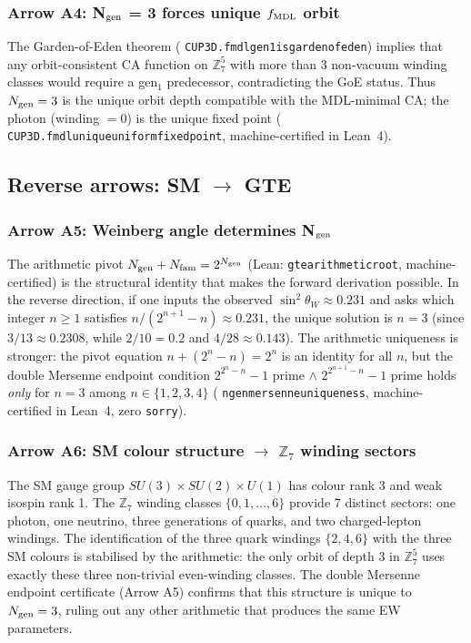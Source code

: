 \documentclass[11pt]{article}
\theoremstyle{remark}
\newcommand{\ZS}{\mathbb{Z}_7}
\newcommand{\Ngen}{N_{\rm gen}}
\newcommand{\Nfam}{N_{\rm fam}}
\newcommand{\lean}[1]{%
  \penalty-100
  \begingroup\def\_{\textunderscore\allowbreak}\texttt{#1}\endgroup}
\newcommand{\sinwsq}{\sin^2\!\theta_W}
\begin{document}
\subsubsection*{Arrow A4: N$_{\rm gen}$ = 3 forces unique \texorpdfstring{$f_{\rm MDL}$}{fMDL} orbit}

The Garden-of-Eden theorem (\lean{CUP3D.fmdl\_gen1\_is\_garden\_of\_eden}) implies that any
orbit-consistent CA function on $\ZS^5$ with more than 3 non-vacuum winding classes would
require a gen$_1$ predecessor, contradicting the GoE status.
Thus $\Ngen = 3$ is the unique orbit depth compatible with the MDL-minimal CA;
the photon (winding $= 0$) is the unique fixed point (\lean{CUP3D.fmdl\_unique\_uniform\_fixed\_point}, machine-certified in Lean~4).

\subsection{Reverse arrows: SM $\to$ GTE}
\label{sec:arrows_reverse}

\subsubsection*{Arrow A5: Weinberg angle determines N$_{\rm gen}$}

The arithmetic pivot $\Ngen + \Nfam = 2^{\Ngen}$ (Lean: \lean{gte\_arithmetic\_root}, machine-certified)
is the structural identity that makes the forward derivation possible.
In the reverse direction, if one inputs the observed $\sinwsq \approx 0.231$ and asks
which integer $n \geq 1$ satisfies $n/(2^{n+1}-n) \approx 0.231$, the unique solution
is $n = 3$ (since $3/13 \approx 0.2308$, while $2/10 = 0.2$ and $4/28 \approx 0.143$).
The arithmetic uniqueness is stronger: the pivot equation $n + (2^n-n) = 2^n$ is an
identity for all $n$, but the double Mersenne endpoint condition
$2^{2^n - n} - 1$ prime $\wedge$ $2^{2^{n+1}-n} - 1$ prime holds \emph{only} for $n = 3$
among $n \in \{1,2,3,4\}$
(\lean{ngen\_3\_mersenne\_uniqueness}, machine-certified in Lean~4, zero \texttt{sorry}).

\subsubsection*{Arrow A6: SM colour structure $\to$ \texorpdfstring{$\mathbb{Z}_7$}{Z7} winding sectors}

The SM gauge group $SU(3) \times SU(2) \times U(1)$ has colour rank 3 and weak
isospin rank 1.
The $\ZS$ winding classes $\{0,1,\ldots,6\}$ provide 7 distinct sectors: one photon,
one neutrino, three generations of quarks, and two charged-lepton windings.
The identification of the three quark windings $\{2,4,6\}$ with the three SM colours
is stabilised by the arithmetic: the only orbit of depth 3 in $\ZS^5$ uses exactly
these three non-trivial even-winding classes.
The double Mersenne endpoint certificate (Arrow A5) confirms that this structure is
unique to $\Ngen = 3$, ruling out any other arithmetic that produces the same EW
parameters.
\end{document}
